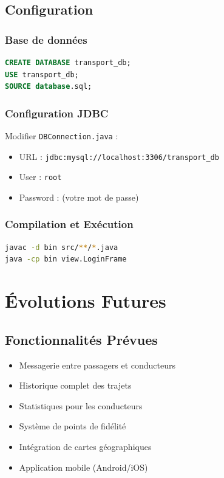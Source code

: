 \documentclass[12pt,a4paper]{report}
\begin{document}
\section{Configuration}

\subsection{Base de données}

\begin{lstlisting}[language=SQL, caption=Création de la base de données]
CREATE DATABASE transport_db;
USE transport_db;
SOURCE database.sql;
\end{lstlisting}

\subsection{Configuration JDBC}

Modifier \texttt{DBConnection.java} :
\begin{itemize}
    \item URL : \texttt{jdbc:mysql://localhost:3306/transport\_db}
    \item User : \texttt{root}
    \item Password : (votre mot de passe)
\end{itemize}

\subsection{Compilation et Exécution}

\begin{lstlisting}[language=bash, caption=Commandes de compilation]
javac -d bin src/**/*.java
java -cp bin view.LoginFrame
\end{lstlisting}

\chapter{Évolutions Futures}

\section{Fonctionnalités Prévues}

\begin{itemize}
    \item Messagerie entre passagers et conducteurs
    \item Historique complet des trajets
    \item Statistiques pour les conducteurs
    \item Système de points de fidélité
    \item Intégration de cartes géographiques
    \item Application mobile (Android/iOS)
\end{itemize}
\end{document}
